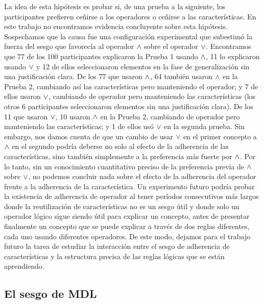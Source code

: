 La idea de esta hipótesis es probar si, de una prueba a la siguiente, los participantes prefieren ceñirse a los operadores o ceñirse a las características. En este trabajo no encontramos evidencia concluyente sobre esta hipótesis. Sospechamos que la causa fue una configuración experimental que subestimó la fuerza del sesgo que favorecía al operador $ \land $ sobre el operador $ \lor $. Encontramos que 77 de los 100 participantes explicaron la Prueba 1 usando $ \land $, 11 lo explicaron usando $ \lor $ y 12 de ellos seleccionaron elementos en la fase de generalización sin una justificación clara. De los 77 que usaron $ \land $, 64 también usaron $ \land $ en la Prueba 2, cambiando así las características pero manteniendo el operador; y 7 de ellos usaron $ \lor $, cambiando de operador pero manteniendo las características (los otros 6 participantes seleccionaron elementos sin una justificación clara). De los 11 que usaron $ \lor $, 10 usaron $ \land $ en la Prueba 2, cambiando de operador pero manteniendo las características; y 1 de ellos usó $ \lor $ en la segunda prueba. Sin embargo, nos damos cuenta de que un cambio de usar $ \lor $ en el primer concepto a $ \land $ en el segundo podría deberse no solo al efecto de la adherencia de las características, sino también simplemente a la preferencia más fuerte por $ \land$. Por lo tanto, sin un conocimiento cuantitativo preciso de la preferencia previa de $ \land $ sobre $ \lor $, no podemos concluir nada sobre el efecto de la adherencia del operador frente a la adherencia de la característica. Un experimento futuro podría probar la existencia de adherencia de operador al tener períodos consecutivos más largos donde la reutilización de características no es un sesgo útil y donde solo un operador lógico sigue siendo útil para explicar un concepto, antes de presentar finalmente un concepto que se puede explicar a través de dos reglas diferentes, cada uno usando diferentes operadores. De este modo, dejamos para el trabajo futuro la tarea de estudiar la interacción entre el sesgo de adherencia de características y la estructura precisa de las reglas lógicas que se están aprendiendo.


\subsection{El sesgo de MDL} \label{Resultados:MDLbias} 


